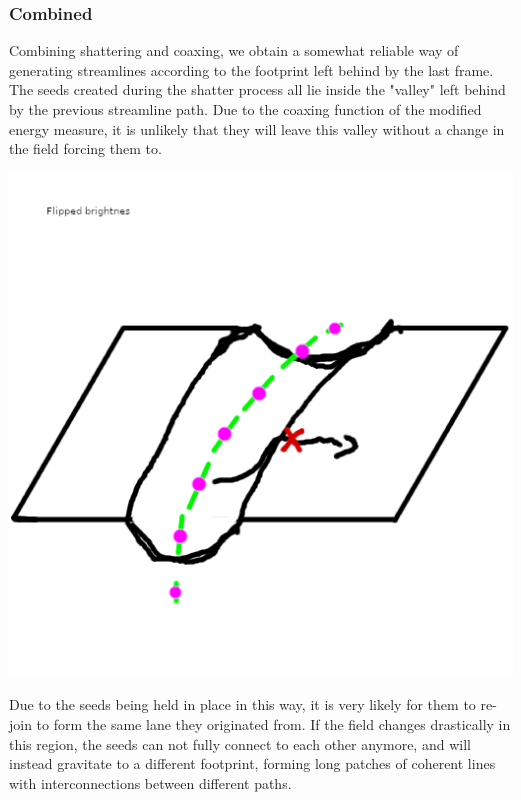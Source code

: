 \subsubsection*{Combined}
\begin{minipage}{.55\textwidth}
    Combining shattering and coaxing, we obtain a somewhat reliable way of generating streamlines according to the footprint left behind by the last frame.
    The seeds created during the shatter process all lie inside the "valley" left behind by the previous streamline path.
    Due to the coaxing function of the modified energy measure,
    it is unlikely that they will leave this valley without a change in the field forcing them to.
\end{minipage}
\begin{minipage}{.45\textwidth}
    \includegraphics{figures/SL_bump2.png}
\end{minipage}
Due to the seeds being held in place in this way, it is very likely for them to re-join to form the same lane they originated from.
If the field changes drastically in this region, the seeds can not fully connect to each other anymore, and will instead gravitate to a different footprint,
forming long patches of coherent lines with interconnections between different paths.
